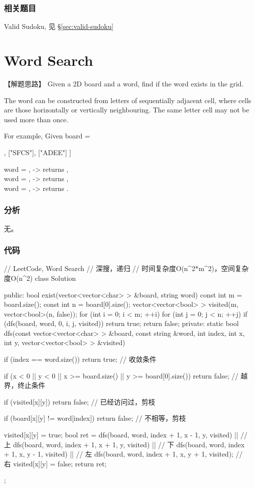 \subsubsection{相关题目}
\begindot
\item Valid Sudoku, 见 \S \ref{sec:valid-sudoku}
\myenddot


\section{Word Search} %
\label{sec:word-search}


【解题思路】
Given a 2D board and a word, find if the word exists in the grid.

The word can be constructed from letters of sequentially adjacent cell, where  cells are those horizontally or vertically neighbouring. The same letter cell may not 
be used more than once.

For example,
Given board =
\begin{Code}
	[
	["ABCE"],
	["SFCS"],
	["ADEE"]
	]
\end{Code}
word = , -> returns ,\\
word = , -> returns ,\\
word = , -> returns .


\subsubsection{分析}
无。


\subsubsection{代码}
\begin{Code}
	// LeetCode, Word Search
	// 深搜，递归
	// 时间复杂度O(n^2*m^2)，空间复杂度O(n^2)
	class Solution {
		public:
		bool exist(vector<vector<char> > &board, string word) {
			const int m = board.size();
			const int n = board[0].size();
			vector<vector<bool> > visited(m, vector<bool>(n, false));
			for (int i = 0; i < m; ++i)
			for (int j = 0; j < n; ++j)
			if (dfs(board, word, 0, i, j, visited))
			return true;
			return false;
		}
		private:
		static bool dfs(const vector<vector<char> > &board, const string &word,
		int index, int x, int y, vector<vector<bool> > &visited) {
			if (index == word.size())
			return true; // 收敛条件
			
			if (x < 0 || y < 0 || x >= board.size() || y >= board[0].size())
			return false;  // 越界，终止条件
			
			if (visited[x][y]) return false; // 已经访问过，剪枝
			
			if (board[x][y] != word[index]) return false; // 不相等，剪枝
			
			visited[x][y] = true;
			bool ret = dfs(board, word, index + 1, x - 1, y, visited) || // 上
			dfs(board, word, index + 1, x + 1, y, visited)    || // 下
			dfs(board, word, index + 1, x, y - 1, visited)    || // 左
			dfs(board, word, index + 1, x, y + 1, visited);      // 右
			visited[x][y] = false;
			return ret;
		}
	};
\end{Code}


